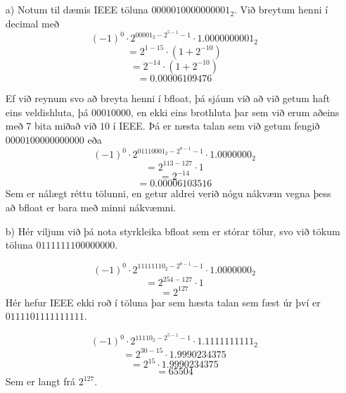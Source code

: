 \documentclass{article}
\begin{document}
	\section{}

	\begin{itemize}
		\item[a)] Notum til dæmis IEEE töluna $0000010000000001_2$. Við 
			breytum henni í decimal með
			\[
				(-1)^0\cdot2^{00001_2 - 2^{5-1}-1} \cdot 
				1.0000000001_2
			\]
			\[
				= 2^{1-15}\cdot (1+2^{-10})
			\]
			\[
				= 2^{-14}\cdot (1+2^{-10})
			\]
			\[
				= 0.00006109476
			\]

			Ef við reynum svo að breyta henni í bfloat, þá sjáum við að 
			við getum haft eins veldishluta, þá $00010000$, en ekki eins 
			brothluta þar sem við erum aðeins með $7$ bita miðað við $10$ í 
			IEEE. Þá er næsta talan sem við getum fengið 
			$0000100000000000$ eða 
			\[
				(-1)^0\cdot2^{01110001_2 - 2^{8-1}-1}\cdot 1.0000000_2
			\]
			\[
				= 2^{113-127}\cdot 1
			\]
			\[
				= 2^{-14}
			\]
			\[
				= 0.00006103516
			\]
			Sem er nálægt réttu tölunni, en getur aldrei verið nógu nákvæm 
			vegna þess að bfloat er bara með minni nákvæmni.
		\item[b)] Hér viljum við þá nota styrkleika bfloat sem er stórar 
			tölur, svo við tökum töluna $0111111100000000$.

			\[
				(-1)^0\cdot2^{11111110_2 - 2^{8-1}-1}\cdot 1.0000000_2
			\]
			\[
				= 2^{254 - 127}\cdot 1
			\]
			\[
				= 2^{127}
			\]
			Hér hefur IEEE ekki roð í töluna þar sem hæsta talan sem fæst 
			úr því er $0111101111111111$.

			\[
				(-1)^0\cdot2^{11110_2 - 2^{5-1}-1}\cdot 1.1111111111_2
			\]
			\[
				= 2^{30 - 15}\cdot 1.9990234375
			\]
			\[
				= 2^{15}\cdot 1.9990234375
			\]
			\[
				= 65504
			\]
			Sem er langt frá $2^{127}$.
	\end{itemize}
\end{document}
